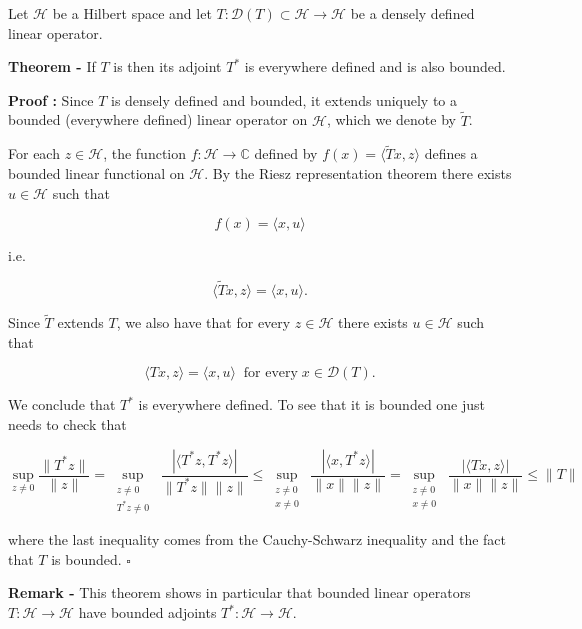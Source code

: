 \documentclass[12pt]{article}
\begin{document}

Let $\mathscr{H}$ be a Hilbert space and let $T: \mathscr{D}(T)\subset \mathscr{H}\longrightarrow \mathscr{H}$ be a densely defined linear operator.

{\bf Theorem - } If $T$ is  then its adjoint $T^*$ is everywhere defined and is also bounded.

{\bf Proof :} Since $T$ is densely defined and bounded, it extends uniquely to a bounded (everywhere defined) linear operator on $\mathscr{H}$, which we denote by $\widetilde{T}$.

For each $z \in \mathscr{H}$, the function $f: \mathscr{H} \longrightarrow \mathbb{C}$ defined by 
$f(x)=\langle \widetilde{T}x, z\rangle$ defines a bounded linear functional on $\mathscr{H}$. By the Riesz representation theorem there exists $u \in \mathscr{H}$ such that

\begin{displaymath}
f(x) = \langle x, u \rangle
\end{displaymath}

i.e.

\begin{displaymath}
\langle \widetilde{T}x, z\rangle = \langle x, u \rangle .
\end{displaymath}

Since $\widetilde{T}$ extends $T$, we also have that for every $z \in \mathscr{H}$ there exists $u \in \mathscr{H}$ such that

\begin{displaymath}
\langle Tx, z\rangle = \langle x, u\rangle \;\;\text{for every}\; x \in \mathscr{D}(T) .
\end{displaymath}

We conclude that $T^*$ is everywhere defined. To see that it is bounded one just needs to check that

\begin{displaymath}
\sup_{z\neq 0} \frac{\|T^*z\|}{\|z\|} = \sup_{\substack{z\neq 0 \\ T^*z \neq 0}}\; \frac{|\langle T^*z, T^*z \rangle |}{\|T^*z\| \|z\|} \leq \sup_{\substack{z \neq  0 \\ x \neq 0}}\; \frac{|\langle x, T^*z \rangle |}{\|x\| \|z\|} =
\sup_{\substack{z \neq  0 \\ x \neq 0}}\; \frac{|\langle Tx, z \rangle |}{\|x\| \|z\|} \leq \|T\|
\end{displaymath}

where the last inequality comes from the Cauchy-Schwarz inequality and the fact that $T$ is bounded. $\square$

{\bf Remark -} This theorem shows in particular that bounded linear operators $T : \mathscr{H} \longrightarrow \mathscr{H}$ have bounded adjoints $T^* : \mathscr{H} \longrightarrow \mathscr{H}$.
\end{document}
